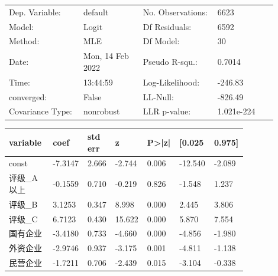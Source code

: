 \begin{table}
	\caption{Logit 模型回归结果}
	\begin{tabular}{p{0.25\linewidth}p{0.2\linewidth}p{0.25\linewidth}p{0.2\linewidth}}
		\hline
		Dep. Variable:   & default          & No. Observations: & 6623       \\
		Model:           & Logit            & Df Residuals:     & 6592       \\
		Method:          & MLE              & Df Model:         & 30         \\
		Date:            & Mon, 14 Feb 2022 & Pseudo R-squ.:    & 0.7014     \\
		Time:            & 13:44:59         & Log-Likelihood:   & -246.83    \\
		converged:       & False            & LL-Null:          & -826.49    \\
		Covariance Type: & nonrobust        & LLR p-value:      & 1.021e-224 \\
	\end{tabular}
	\begin{longtable}{p{0.18\linewidth}p{0.1\linewidth}p{0.1\linewidth}p{0.1\linewidth}p{0.1\linewidth}p{0.12\linewidth}p{0.1\linewidth}}
		\hline
		\textbf{variable}  & \textbf{coef} & \textbf{std err} & \textbf{z} & \textbf{P>|z|} & \textbf{[0.025} & \textbf{0.975]} \\ \hline
		const              & -7.3147       & 2.666            & -2.744     & 0.006          & -12.540         & -2.089          \\ \hline
		评级\_A以上        & -0.1559       & 0.710            & -0.219     & 0.826          & -1.548          & 1.237           \\ \hline
		评级\_B            & 3.1253        & 0.347            & 8.998      & 0.000          & 2.445           & 3.806           \\ \hline
		评级\_C            & 6.7123        & 0.430            & 15.622     & 0.000          & 5.870           & 7.554           \\ \hline
		国有企业           & -3.4180       & 0.733            & -4.660     & 0.000          & -4.856          & -1.980          \\ \hline
		外资企业           & -2.9746       & 0.937            & -3.175     & 0.001          & -4.811          & -1.138          \\ \hline
		民营企业           & -1.7211       & 0.706            & -2.439     & 0.015          & -3.104          & -0.338          \\ \hline

\end{longtable}
\end{table}
